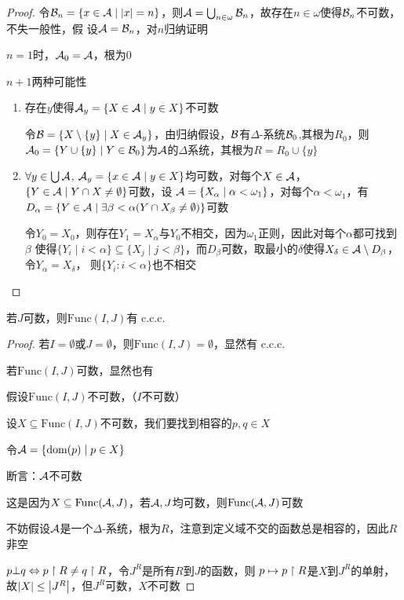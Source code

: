 \documentclass[11pt]{article}
\def \Func {\text{Func}}
\begin{document}
\begin{proof}
令\(\calb_n=\{x\in\cala\mid\abs{x}=n\}\)，则\(\mathcal{A}=\bigcup_{n\in\omega}\mathcal{B}_n\)，故存在\(n\in\omega\)使得\(\mathcal{B}_n\)不可数，不失一般性，假
设\(\mathcal{A}=\mathcal{B}_n\)，对\(n\)归纳证明

\(n=1\)时，\(\mathcal{A}_0=\mathcal{A}\)，根为0

\(n+1\)两种可能性
\begin{enumerate}
\item 存在\(y\)使得\(\mathcal{A}_y=\{X\in\mathcal{A}\mid y\in X\}\)不可数

令\(\mathcal{B}=\{X\setminus\{y\}\mid X\in\mathcal{A}_y\}\)，由归纳假设，\(\mathcal{B}\)有\(\Delta\)-系统\(\mathcal{B}_0\),其根为\(R_0\)，则
\(\mathcal{A}_0=\{Y\cup\{y\}\mid Y\in\mathcal{B}_0\}\)为\(\mathcal{A}\)的\(\Delta\)系统，其根为\(R=R_0\cup\{y\}\)
\item \(\forall y\in\bigcup\mathcal{A}\), \(\mathcal{A}_y=\{x\in\mathcal{A}\mid y\in X\}\)均可数，对每个\(X\in\mathcal{A}\)，\(\{Y\in\mathcal{A}\mid Y\cap X\neq\emptyset\}\)可数，设
\(\mathcal{A}=\{X_\alpha\mid\alpha<\omega_1\}\)，对每个\(\alpha<\omega_1\)，有
\(D_\alpha=\{Y\in\mathcal{A}\mid\exists\beta<\alpha(Y\cap X_\beta\neq\emptyset)\}\)可数

令\(Y_0=X_0\)，则存在\(Y_1=X_\alpha\)与\(Y_0\)不相交，因为\(\omega_1\)正则，因此对每个\(\alpha\)都可找到\(\beta\)
使得\(\{Y_i\mid i<\alpha\}\subseteq\{X_j\mid j<\beta\}\)，而\(D_\beta\)可数，取最小的\(\delta\)使得\(X_\delta\in\mathcal{A}\setminus D_\beta\)，令\(Y_\alpha=X_\delta\)，
则\(\{Y_i:i<\alpha\}\)也不相交
\end{enumerate}
\end{proof}

\begin{lemma}[]
若\(J\)可数，则\(\Func(I,J)\)有 c.c.c.
\end{lemma}

\begin{proof}
若\(I=\emptyset\)或\(J=\emptyset\)，则\(\Func(I,J)=\emptyset\)，显然有 c.c.c.

若\(\Func(I,J)\)可数，显然也有

假设\(\Func(I,J)\)不可数，（\(I\)不可数）

设\(X\subseteq\Func(I,J)\)不可数，我们要找到相容的\(p,q\in X\)

令\(\mathcal{A}=\{\operatorname{dom}(p)\mid p\in X\}\)

断言：\(\mathcal{A}\)不可数

这是因为\(X\subseteq\Func(\cala,J)\)，若\(\mathcal{A},J\)均可数，则\(\Func(\cala,J)\)可数

不妨假设\(\mathcal{A}\)是一个\(\Delta\)-系统，根为\(R\)，注意到定义域不交的函数总是相容的，因此\(R\)非空

\(p\bot q\Leftrightarrow p\upharpoonright R\neq q\upharpoonright R\)，令\(J^R\)是所有\(R\)到\(J\)的函数，则
\(p\mapsto p\upharpoonright R\)是\(X\)到\(J^R\)的单射，故\(\abs{X}\le\abs{J^R}\)，但\(J^R\)可数，\(X\)不可数
\end{proof}
\end{document}
